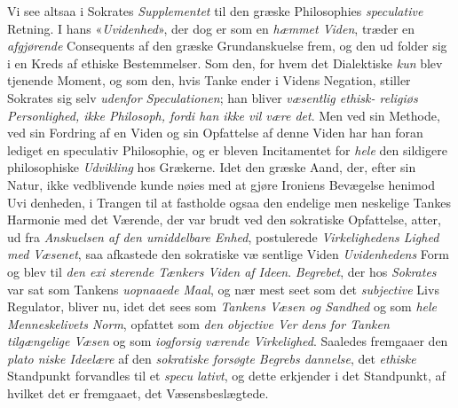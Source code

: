 Vi see altsaa i Sokrates \emph{Supplementet} til den græske
Philosophies \emph{speculative} Retning. I hans «\emph{Uvidenhed}»,
der dog er som en \emph{hæmmet Viden}, træder en \emph{afgjørende}
Consequents af den græske Grundanskuelse frem, og den ud\-%
folder sig i en Kreds af ethiske Bestemmelser. Som den, for
hvem det Dialektiske \emph{kun} blev tjenende Moment, og som den,
hvis Tanke ender i Videns Negation, stiller Sokrates sig selv
\emph{udenfor Speculationen}; han bliver \emph{væsentlig ethisk-%
religiøs Personlighed, ikke Philosoph, fordi han
ikke vil være det}. Men ved sin Methode, ved sin Fordring
af en Viden og sin Opfattelse af denne Viden har han foran\-%
lediget en speculativ Philosophie, og er bleven Incitamentet for
\emph{hele} den sildigere philosophiske \emph{Udvikling} hos Grækerne.
Idet den græske Aand, der, efter sin Natur, ikke vedblivende
kunde nøies med at gjøre Ironiens Bevægelse henimod Uvi\-%
denheden, i Trangen til at fastholde ogsaa den endelige men\-%
neskelige Tankes Harmonie med det Værende, der var brudt
ved den sokratiske Opfattelse, atter, ud fra \emph{Anskuelsen af
den umiddelbare Enhed}, postulerede \emph{Virkelighedens
Lighed med Væsenet}, saa afkastede den sokratiske væ\-%
sentlige Viden \emph{Uvidenhedens} Form og blev til \emph{den exi\-%
sterende Tænkers Viden af Ideen}. \emph{Begrebet}, der hos
\emph{Sokrates} var sat som Tankens \emph{uopnaaede Maal}, og nær\-%
mest seet som det \emph{subjective} Livs Regulator, bliver nu, idet
det sees som \emph{Tankens Væsen og Sandhed} og som \emph{hele
Menneskelivets Norm}, opfattet som \emph{den objective Ver\-%
dens for Tanken tilgængelige Væsen} og som \emph{iogforsig\-%
værende Virkelighed}. Saaledes fremgaaer den \emph{plato\-%
niske Ideelære} af den \emph{sokratiske forsøgte Begrebs\-%
dannelse}, det \emph{ethiske} Standpunkt forvandles til et \emph{specu\-%
lativt}, og dette erkjender i det Standpunkt, af hvilket det er
fremgaaet, det Væsensbeslægtede.

\divrule

